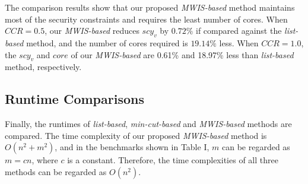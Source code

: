 \documentclass[10pt,journal]{IEEEtran}
\begin{document}
The comparison results show that our proposed \textit{MWIS-based} method maintains most of the security constraints and requires the least number of cores. When $CCR=0.5$, our \textit{MWIS-based} reduces $scy_v$ by $0.72\%$ if compared against the \textit{list-based} method, and the number of cores required is $19.14\%$ less. When $CCR=1.0$, the $scy_v$ and $core$ of our \textit{MWIS-based} are 0.61\% and 18.97\% less than \textit{list-based} method, respectively.










\subsection{Runtime Comparisons}


Finally, the runtimes of \textit{list-based}, \textit{min-cut-based} and \textit{MWIS-based} methods are compared. The time complexity of our proposed \textit{MWIS-based} method is $O(n^2+m^2)$, and in the benchmarks shown in Table I, $m$ can be regarded as $m=cn$, where $c$ is a constant. Therefore, the time complexities of all three methods can be regarded as $O(n^2)$.
\end{document}
